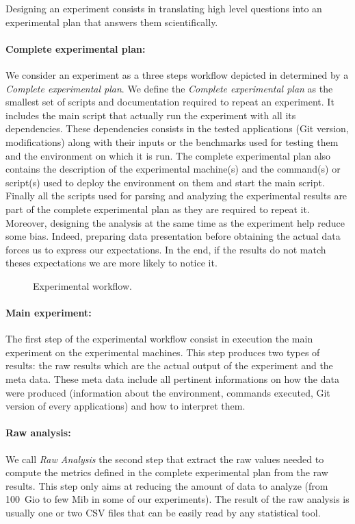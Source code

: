 Designing an experiment consists in translating high level questions into an experimental plan that answers them scientifically.

\paragraph{Complete experimental plan:}
We consider an experiment as a three steps workflow depicted in  determined by a \emph{Complete experimental plan}.
We define the \emph{Complete experimental plan} as the smallest set of scripts and documentation required to repeat an experiment.
It includes the main script that actually run the experiment with all its dependencies.
These dependencies consists in the tested applications (\gls{Git} version, modifications) along with their inputs or the benchmarks used for testing them and the environment on which it is run.
The complete experimental plan also contains the description of the experimental machine(s) and the command(s) or script(s) used to deploy the environment on them and start the main script.
Finally all the scripts used for parsing and analyzing the experimental results are part of the complete experimental plan as they are required to repeat it.
Moreover, designing the analysis at the same time as the experiment help reduce some bias.
Indeed, preparing data presentation before obtaining the actual data forces us to express our expectations.
In the end, if the results do not match theses expectations we are more likely to notice it.

\begin{figure}[htb]
    \centering
    
    \caption{Experimental workflow.}
    \label{fig:exp-pipeline}
\end{figure}

\paragraph{Main experiment:}
The first step of the experimental workflow consist in execution the main experiment on the experimental machines.
This step produces two types of results: the raw results which are the actual output of the experiment and the meta data.
These meta data include all pertinent informations on how the data were produced (information about the environment, commands executed, \gls{Git} version of every applications) and how to interpret them.

\paragraph{Raw analysis:}
We call \emph{Raw Analysis} the second step that extract the raw values needed to compute the metrics defined in the complete experimental plan from the raw results.
This step only aims at reducing the amount of data to analyze (from \SI{100}{Gio} to few Mib in some of our experiments).
The result of the raw analysis is usually one or two \gls{CSV} files that can be easily read by any statistical tool.

